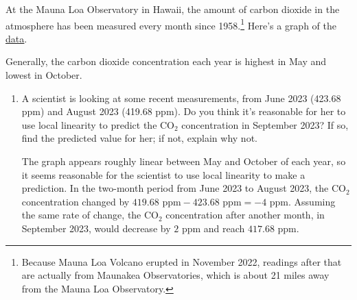 \documentclass{article}
\makeatletter
\let\@href=\href
\renewcommand{\href}[2]{\@href{#1}{\ul{#2}}}
\makeatother
\begin{document}
\begin{enumerate}
  At the Mauna Loa Observatory in Hawaii, the amount of carbon dioxide in the atmosphere has been measured every month since 1958.\footnote{Because Mauna Loa Volcano erupted in November 2022, readings after that are actually from Maunakea Observatories, which is about 21 miles away from the Mauna Loa Observatory.} Here's a graph of the \href{https://gml.noaa.gov/ccgg/trends/data.html}{data}.
  \begin{center}
  \end{center}
  Generally, the carbon dioxide concentration each year is highest in May and lowest in October.

  \begin{enumerate}
  \item \label{mauna-loa-reasonable}


    \begin{problem}[\vfill\newpage]
      A scientist is looking at some recent measurements, from June 2023 (423.68 ppm) and August 2023 (419.68 ppm). Do you think it's reasonable for her to use local linearity to predict the CO$_2$ concentration in September 2023? If so, find the predicted value for her; if not, explain why not.
    \end{problem}

    \begin{solution}
      The graph appears roughly linear between May and October of each year, so it seems reasonable for
      the scientist to use local linearity to make a prediction. 
      In the two-month period from June 2023 to August 2023, the CO$_2$
      concentration changed by $419.68\text{ ppm}-423.68\text{ ppm} = -4\text{ ppm}$. Assuming the same
      rate of change, the CO$_2$ concentration after another month, in September 2023, would decrease by 
      $2\text{ ppm}$ and reach $417.68\text{ ppm}$. 
    \end{solution}


\end{enumerate}
\end{enumerate}
\end{document}
